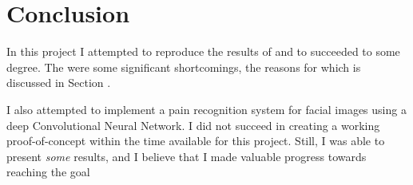 \documentclass[Main]{subfiles}
\begin{document}
\section{Conclusion} %
	\label{sec:conclusion}
	In this project I attempted to reproduce the results of  and to succeeded to some degree. 
	The were some significant shortcomings, the reasons for which is discussed in Section .

	I also attempted to implement a pain recognition system for facial images using a deep Convolutional Neural Network.
	I did not succeed in creating a working proof-of-concept within the time available for this project.
	Still, I was able to present \emph{some} results, and I believe that I made valuable progress towards reaching the goal
\end{document}
